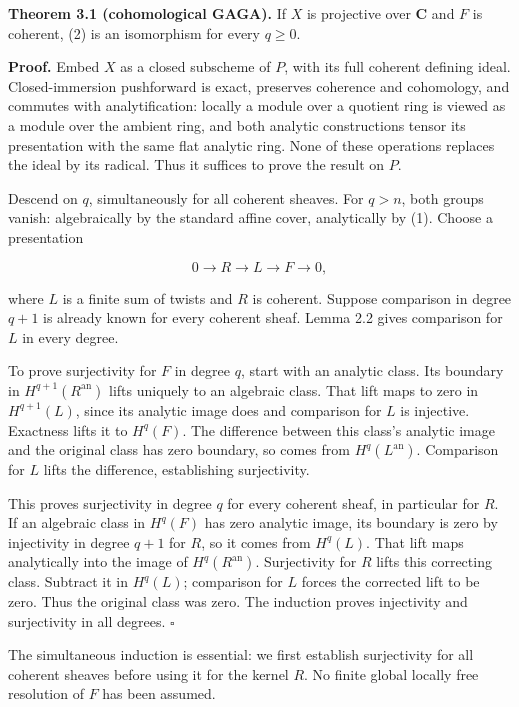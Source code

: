 \documentclass[11pt]{article}
\begin{document}
\textbf{Theorem 3.1 (cohomological GAGA).} If \(X\) is projective over
\(\mathbf C\) and \(F\) is coherent, (2) is an isomorphism for every
\(q\geq0\).

\textbf{Proof.} Embed \(X\) as a closed subscheme of \(P\), with its
full coherent defining ideal. Closed-immersion pushforward is exact,
preserves coherence and cohomology, and commutes with analytification:
locally a module over a quotient ring is viewed as a module over the
ambient ring, and both analytic constructions tensor its presentation
with the same flat analytic ring. None of these operations replaces the
ideal by its radical. Thus it suffices to prove the result on \(P\).

Descend on \(q\), simultaneously for all coherent sheaves. For \(q>n\),
both groups vanish: algebraically by the standard affine cover,
analytically by (1). Choose a presentation

\[
0\to R\to L\to F\to0,
\tag{4}
\]

where \(L\) is a finite sum of twists and \(R\) is coherent. Suppose
comparison in degree \(q+1\) is already known for every coherent sheaf.
Lemma 2.2 gives comparison for \(L\) in every degree.

To prove surjectivity for \(F\) in degree \(q\), start with an analytic
class. Its boundary in \(H^{q+1}(R^{\mathrm{an}})\) lifts uniquely to an
algebraic class. That lift maps to zero in \(H^{q+1}(L)\), since its
analytic image does and comparison for \(L\) is injective. Exactness
lifts it to \(H^q(F)\). The difference between this class's analytic
image and the original class has zero boundary, so comes from
\(H^q(L^{\mathrm{an}})\). Comparison for \(L\) lifts the difference,
establishing surjectivity.

This proves surjectivity in degree \(q\) for every coherent sheaf, in
particular for \(R\). If an algebraic class in \(H^q(F)\) has zero
analytic image, its boundary is zero by injectivity in degree \(q+1\)
for \(R\), so it comes from \(H^q(L)\). That lift maps analytically into
the image of \(H^q(R^{\mathrm{an}})\). Surjectivity for \(R\) lifts this
correcting class. Subtract it in \(H^q(L)\); comparison for \(L\) forces
the corrected lift to be zero. Thus the original class was zero. The
induction proves injectivity and surjectivity in all degrees.
\(\square\)

The simultaneous induction is essential: we first establish surjectivity
for all coherent sheaves before using it for the kernel \(R\). No finite
global locally free resolution of \(F\) has been assumed.
\end{document}
